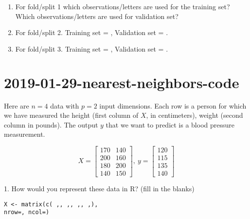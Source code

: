 \documentclass{article}
\begin{document}
\begin{enumerate}
\vskip 1cm
\item For fold/split 1 which observations/letters are used for the
  training set?  \underline{\hspace{1.5in}} Which observations/letters
  are used for validation set? \underline{\hspace{1.5in}}

\vskip 1cm
\item For fold/split 2. Training set = \underline{\hspace{1.5in}},
  Validation set = \underline{\hspace{1.5in}}.

\vskip 1cm
\item For fold/split 3. Training set = \underline{\hspace{1.5in}},
  Validation set = \underline{\hspace{1.5in}}.
\end{enumerate}



\newpage
\section{2019-01-29-nearest-neighbors-code}
Here are $n=4$ data with $p=2$ input dimensions. Each row is a person
for which we have measured the height (first column of $X$, in
centimeters), weight (second column in pounds). The output $y$ that we
want to predict is a blood pressure measurement.

\begin{equation*}
  X = \left[\begin{array}{cc}
              170 & 140 \\
              200 & 160 \\
              180 & 200 \\
              140 & 150 
\end{array}\right],\ 
  y = \left[\begin{array}{c}
              120 \\
              115 \\
              135 \\
              140 
\end{array}\right]
\end{equation*}

1. How would you represent these data in R? (fill in the blanks)

\texttt{X <- matrix(c(%
\underline{\hspace{1cm}},\underline{\hspace{1cm}},%
\underline{\hspace{1cm}},\underline{\hspace{1cm}},%
\underline{\hspace{1cm}},\underline{\hspace{1cm}},%
\underline{\hspace{1cm}},\underline{\hspace{1cm}}),\\
  nrow=\underline{\hspace{1cm}},
  ncol=\underline{\hspace{1cm}})}
\end{document}
